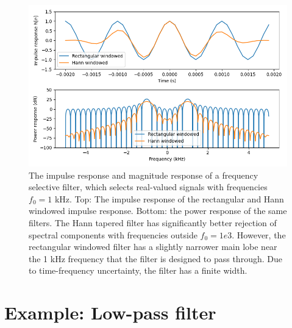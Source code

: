 \begin{figure}
  \begin{center}
    \includegraphics[width=\textwidth]{code/022_window_functions/freq_filter.png}
  \end{center}
  \caption{The impulse response and magnitude response of a frequency selective filter,
    which selects real-valued signals with frequencies $f_0=1$ kHz.
    Top: The impulse response of the rectangular and Hann windowed impulse response.
    Bottom: the power response of the same filters.
    The Hann tapered filter has significantly better rejection of spectral
    components with frequencies outside $f_0=1e3$. However, the rectangular
    windowed filter has a slightly narrower main lobe near the 1 kHz frequency
    that the filter is designed to pass through.
    Due to time-frequency uncertainty, the filter has a finite width.}
  \label{fig:frequency_selective}
\end{figure}




\section{Example: Low-pass filter}

